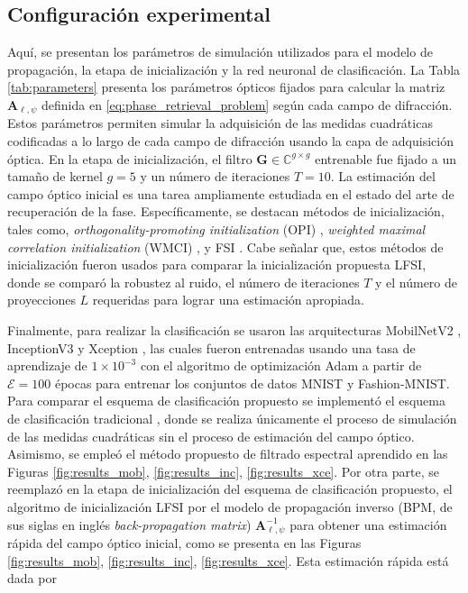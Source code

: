 
\subsection{Configuración experimental}

Aquí, se presentan los parámetros de simulación utilizados para el modelo de propagación, la etapa de inicialización y la red neuronal de clasificación. La Tabla \ref{tab:parameters} presenta los parámetros ópticos fijados para calcular la matriz $\mathbf{A}_{\ell,\psi}$ definida en \eqref{eq:phase_retrieval_problem} según cada campo de difracción. Estos parámetros permiten simular la adquisición de las medidas cuadráticas codificadas a lo largo de cada campo de difracción usando la capa de adquisición óptica. En la etapa de inicialización, el filtro $\mathbf{G} \in \mathbb{C}^{g\times g}$ entrenable fue fijado a un tamaño de kernel $g=5$ y un número de iteraciones $T=10$. La estimación del campo óptico inicial es una tarea ampliamente estudiada en el estado del arte de recuperación de la fase. Específicamente, se destacan métodos de inicialización, tales como, \textit{orthogonality-promoting initialization} (OPI) , \textit{weighted maximal correlation initialization} (WMCI) , y FSI . Cabe señalar que, estos métodos de inicialización fueron usados para comparar la inicialización propuesta LFSI, donde se comparó la robustez al ruido, el número de iteraciones ${T}$ y el número de proyecciones ${L}$ requeridas para lograr una estimación apropiada. 

Finalmente, para realizar la clasificación se usaron las arquitecturas MobilNetV2 , InceptionV3  y Xception , las cuales fueron entrenadas usando una tasa de aprendizaje de $1\times 10^{-3}$ con el algoritmo de optimización Adam a partir de $\mathcal{E}=100$ épocas para entrenar los conjuntos de datos MNIST y Fashion-MNIST. Para comparar el esquema de clasificación propuesto se implementó el esquema de clasificación tradicional , donde se realiza únicamente el proceso de simulación de las medidas cuadráticas sin el proceso de estimación del campo óptico. Asimismo, se empleó el método propuesto de filtrado espectral aprendido en las Figuras \ref{fig:results_mob}, \ref{fig:results_inc}, \ref{fig:results_xce}. Por otra parte, se reemplazó en la etapa de inicialización del esquema de clasificación propuesto, el algoritmo de inicialización LFSI por el modelo de propagación inverso (BPM, de sus siglas en inglés \textit{back-propagation matrix}) $\mathbf{A}_{\ell, \psi}^{-1}$ para obtener una estimación rápida del campo óptico inicial, como se presenta en las Figuras \ref{fig:results_mob}, \ref{fig:results_inc},  \ref{fig:results_xce}. Esta estimación rápida está dada por 

